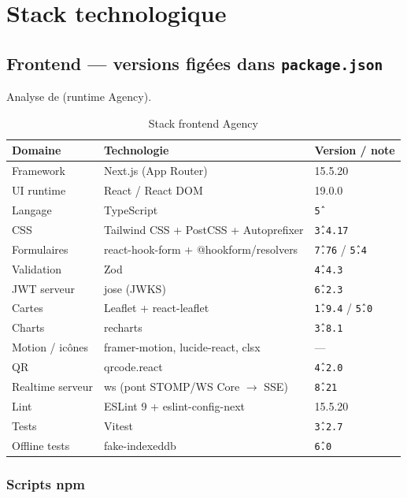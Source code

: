 \chapter{Stack technologique}

\section{Frontend --- versions figées dans \texttt{package.json}}

Analyse de  (runtime Agency).

\begin{table}[h]
\centering
\begin{tabular}{@{}lll@{}}
\toprule
\textbf{Domaine} & \textbf{Technologie} & \textbf{Version / note} \\
\midrule
Framework & Next.js (App Router) & 15.5.20 \\
UI runtime & React / React DOM & 19.0.0 \\
Langage & TypeScript & \texttt{\^5} \\
CSS & Tailwind CSS + PostCSS + Autoprefixer & \texttt{\^3.4.17} \\
Formulaires & react-hook-form + @hookform/resolvers & \texttt{\^7.76} / \texttt{\^5.4} \\
Validation & Zod & \texttt{\^4.4.3} \\
JWT serveur & jose (JWKS) & \texttt{\^6.2.3} \\
Cartes & Leaflet + react-leaflet & \texttt{\^1.9.4} / \texttt{\^5.0} \\
Charts & recharts & \texttt{\^3.8.1} \\
Motion / icônes & framer-motion, lucide-react, clsx & --- \\
QR & qrcode.react & \texttt{\^4.2.0} \\
Realtime serveur & ws (pont STOMP/WS Core $\rightarrow$ SSE) & \texttt{\^8.21} \\
Lint & ESLint 9 + eslint-config-next & 15.5.20 \\
Tests & Vitest & \texttt{\^3.2.7} \\
Offline tests & fake-indexeddb & \texttt{\^6.0} \\
\bottomrule
\end{tabular}
\caption{Stack frontend Agency}
\end{table}

\subsection{Scripts npm}

